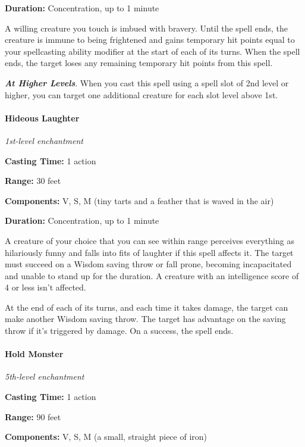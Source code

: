 \documentclass[
]{article}
\begin{document}
\textbf{Duration:} Concentration, up to 1 minute

A willing creature you touch is imbued with bravery. Until the spell
ends, the creature is immune to being frightened and gains temporary hit
points equal to your spellcasting ability modifier at the start of each
of its turns. When the spell ends, the target loses any remaining
temporary hit points from this spell.

\emph{\textbf{At Higher Levels}}. When you cast this spell using a spell
slot of 2nd level or higher, you can target one additional creature for
each slot level above 1st.

\hypertarget{hideous-laughter}{%
\paragraph{Hideous Laughter}\label{hideous-laughter}}

\emph{1st-level enchantment}

\textbf{Casting Time:} 1 action

\textbf{Range:} 30 feet

\textbf{Components:} V, S, M (tiny tarts and a feather that is waved in
the air)

\textbf{Duration:} Concentration, up to 1 minute

A creature of your choice that you can see within range perceives
everything as hilariously funny and falls into fits of laughter if this
spell affects it. The target must succeed on a Wisdom saving throw or
fall prone, becoming incapacitated and unable to stand up for the
duration. A creature with an intelligence score of 4 or less isn't
affected.

At the end of each of its turns, and each time it takes damage, the
target can make another Wisdom saving throw. The target has advantage on
the saving throw if it's triggered by damage. On a success, the spell
ends.

\hypertarget{hold-monster}{%
\paragraph{Hold Monster}\label{hold-monster}}

\emph{5th-level enchantment}

\textbf{Casting Time:} 1 action

\textbf{Range:} 90 feet

\textbf{Components:} V, S, M (a small, straight piece of iron)
\end{document}
